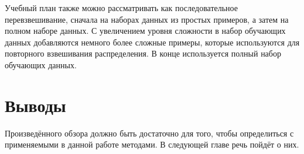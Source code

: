 Учебный план также можно рассматривать как последовательное перевзвешивание, сначала на наборах данных из простых примеров, а затем на полном наборе данных. С увеличением уровня сложности в набор обучающих данных добавляются немного более сложные примеры, которые используются для повторного взвешивания распределения. В конце используется полный набор обучающих данных. \cite{10.1145/1553374.1553380}

\section{Выводы}

Произведённого обзора должно быть достаточно для того, чтобы определиться с применяемыми в данной работе методами. В следующей главе речь пойдёт о них.

\newpage %
